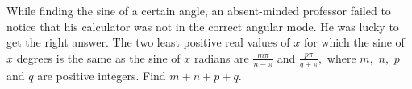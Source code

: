 While finding the sine of a certain angle, an absent-minded professor failed to notice that his calculator was not in the correct angular mode. He was lucky to get the right answer. The two least positive real values of $x$ for which the sine of $x$ degrees is the same as the sine of $x$ radians are $\frac{m\pi}{n-\pi}$ and $\frac{p\pi}{q+\pi},$ where $m,$ $n,$ $p$ and $q$ are positive integers. Find $m+n+p+q.$